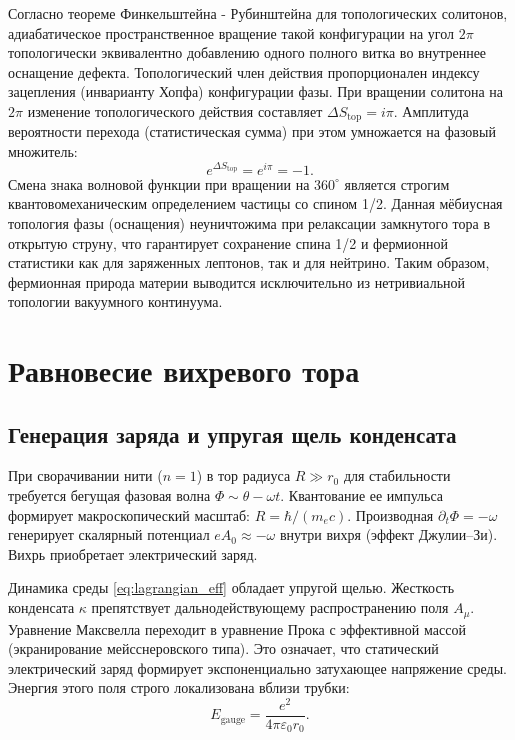 \documentclass[12pt,a4paper]{article}
\begin{document}
	Согласно теореме Финкельштейна - Рубинштейна для топологических солитонов, адиабатическое пространственное вращение такой конфигурации на угол $2\pi$ топологически эквивалентно добавлению одного полного витка во внутреннее оснащение дефекта. Топологический член действия пропорционален индексу зацепления (инварианту Хопфа) конфигурации фазы. При вращении солитона на $2\pi$ изменение топологического действия составляет $\Delta S_{\text{top}} = i\pi$. 
	Амплитуда вероятности перехода (статистическая сумма) при этом умножается на фазовый множитель:
	\begin{equation}
		e^{\Delta S_{\text{top}}} = e^{i\pi} = -1.
	\end{equation}
	Смена знака волновой функции при вращении на $360^\circ$ является строгим квантовомеханическим определением частицы со спином 1/2. Данная мёбиусная топология фазы (оснащения) неуничтожима при релаксации замкнутого тора в открытую струну, что гарантирует сохранение спина 1/2 и фермионной статистики как для заряженных лептонов, так и для нейтрино. Таким образом, фермионная природа материи выводится исключительно из нетривиальной топологии вакуумного континуума.

	\section{Равновесие вихревого тора}
	
	\subsection{Генерация заряда и упругая щель конденсата}
	При сворачивании нити ($n=1$) в тор радиуса $R \gg r_0$ для стабильности требуется бегущая фазовая волна $\Phi \sim \theta - \omega t$. Квантование ее импульса формирует макроскопический масштаб: $R = \hbar/(m_e c)$.
	Производная $\partial_t \Phi = -\omega$ генерирует скалярный потенциал $e A_0 \approx -\omega$ внутри вихря (эффект Джулии--Зи). Вихрь приобретает электрический заряд.
	
	Динамика среды \eqref{eq:lagrangian_eff} обладает упругой щелью. Жесткость конденсата $\kappa$ препятствует дальнодействующему распространению поля $A_\mu$. Уравнение Максвелла переходит в уравнение Прока с эффективной массой (экранирование мейсснеровского типа). Это означает, что статический электрический заряд формирует экспоненциально затухающее напряжение среды. Энергия этого поля строго локализована вблизи трубки:
	\begin{equation}
		E_{\text{gauge}} = \frac{e^2}{4\pi\varepsilon_0 r_0}.
	\end{equation}
	
\end{document}
